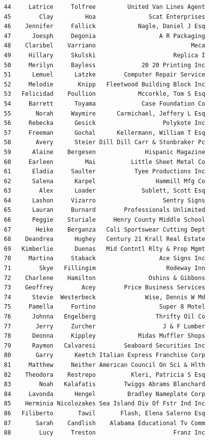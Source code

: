 \documentclass[
  12pt,
]{article}
\begin{document}
\begin{verbatim}
44     Latrice     Tolfree         United Van Lines Agent
45        Clay         Hoa               Scat Enterprises
46    Jennifer     Fallick            Nagle, Daniel J Esq
47      Joesph     Degonia                  A R Packaging
48    Claribel    Varriano                           Meca
49     Hillary     Skulski                      Replica I
50     Merilyn     Bayless             20 20 Printing Inc
51      Lemuel      Latzke        Computer Repair Service
52     Melodie       Knipp   Fleetwood Building Block Inc
53   Felicidad    Poullion            Mccorkle, Tom S Esq
54     Barrett      Toyama             Case Foundation Co
55       Norah     Waymire      Carmichael, Jeffery L Esq
56     Rebecka      Gesick                   Polykote Inc
57     Freeman      Gochal      Kellermann, William T Esq
58       Avery      Steier Dill Dill Carr & Stonbraker Pc
59      Alaine    Bergesen              Hispanic Magazine
60     Earleen         Mai          Little Sheet Metal Co
61      Eladia     Saulter           Tyee Productions Inc
62      Salena      Karpel                 Hammill Mfg Co
63        Alex      Loader             Sublett, Scott Esq
64      Lashon     Vizarro                   Sentry Signs
65      Lauran     Burnard        Professionals Unlimited
66      Peggie    Sturiale     Henry County Middle School
67       Heike    Berganza   Cali Sportswear Cutting Dept
68    Deandrea      Hughey   Century 21 Krall Real Estate
69   Kimberlie      Duenas   Mid Contntl Rlty & Prop Mgmt
70     Martina     Staback                  Ace Signs Inc
71        Skye   Fillingim                    Rodeway Inn
72    Charlene    Hamilton               Oshins & Gibbons
73    Geoffrey        Acey        Price Business Services
74      Stevie  Westerbeck              Wise, Dennis W Md
75     Pamella     Fortino                  Super 8 Motel
76      Johnna   Engelberg                 Thrifty Oil Co
77       Jerry     Zurcher                   J & F Lumber
78      Deonna     Kippley            Midas Muffler Shops
79      Raymon   Calvaresi        Seaboard Securities Inc
80       Garry      Keetch Italian Express Franchise Corp
81     Matthew     Neither American Council On Sci & Hlth
82    Theodora    Restrepo          Kleri, Patricia S Esq
83        Noah   Kalafatis        Twiggs Abrams Blanchard
84     Lavonda      Hengel         Bradley Nameplate Corp
85    Herminia Nicolozakes Sea Island Div Of Fstr Ind Inc
86   Filiberto       Tawil       Flash, Elena Salerno Esq
87       Sarah    Candlish    Alabama Educational Tv Comm
88        Lucy     Treston                      Franz Inc

\end{verbatim}
\end{document}
